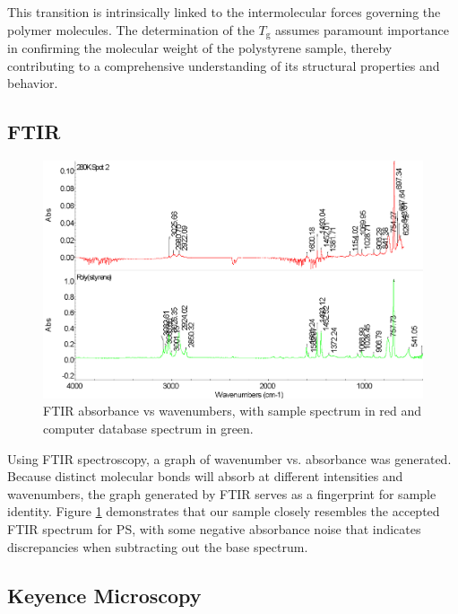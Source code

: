 \documentclass[twocolumn]{article}
\begin{document}
                This transition is intrinsically linked to the intermolecular forces governing the polymer molecules\autocite{WOS:COUCHMAN}. The determination of the $T_\text{g}$ assumes paramount importance in confirming the molecular weight of the polystyrene sample, thereby contributing to a comprehensive understanding of its structural properties and behavior.

            \subsection{FTIR}
                \begin{figure}
                    \centering
                    \includegraphics[width=\columnwidth]{img/ftir-comp.png}
                    \caption{FTIR absorbance vs wavenumbers, with sample spectrum in red and computer database spectrum in green.}\label{fig:ftir-comp}
                \end{figure}
                Using FTIR spectroscopy, a graph of wavenumber vs. absorbance  was generated. Because distinct  molecular bonds will absorb at different intensities and wavenumbers, the graph generated by FTIR serves as a fingerprint for sample identity. Figure \ref{fig:ftir-comp} demonstrates that our sample closely resembles the accepted FTIR spectrum for PS, with some negative absorbance noise that indicates discrepancies when subtracting out the base spectrum.
            
            \subsection{Keyence Microscopy}
\end{document}

